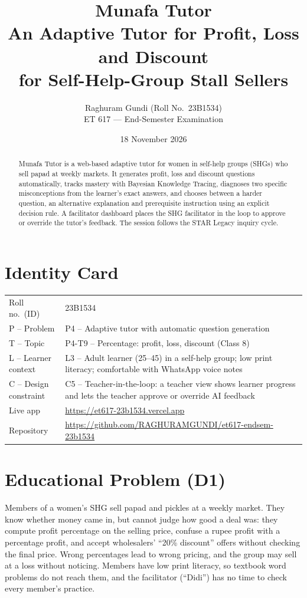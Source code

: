 \documentclass[10pt,a4paper]{article}
\title{\textbf{Munafa Tutor}\\[2pt]\large An Adaptive Tutor for Profit, Loss and Discount\\ for Self-Help-Group Stall Sellers}
\author{Raghuram Gundi \quad (Roll No.\ 23B1534)\\ ET 617 --- End-Semester Examination}
\date{18 November 2026}
\begin{document}
\maketitle

\begin{abstract}
\noindent Munafa Tutor is a web-based adaptive tutor for women in self-help groups (SHGs) who sell papad at weekly markets. It generates profit, loss and discount questions automatically, tracks mastery with Bayesian Knowledge Tracing, diagnoses two specific misconceptions from the learner's exact answers, and chooses between a harder question, an alternative explanation and prerequisite instruction using an explicit decision rule. A facilitator dashboard places the SHG facilitator in the loop to approve or override the tutor's feedback. The session follows the STAR Legacy inquiry cycle.
\end{abstract}

\section*{Identity Card}
\begin{tabularx}{\linewidth}{@{}lY@{}}
\toprule
Roll no.\ (ID) & 23B1534 \\
P -- Problem & P4 -- Adaptive tutor with automatic question generation \\
T -- Topic & P4-T9 -- Percentage: profit, loss, discount (Class 8) \\
L -- Learner context & L3 -- Adult learner (25--45) in a self-help group; low print literacy; comfortable with WhatsApp voice notes \\
C -- Design constraint & C5 -- Teacher-in-the-loop: a teacher view shows learner progress and lets the teacher approve or override AI feedback \\
Live app & \url{https://et617-23b1534.vercel.app} \\
Repository & \url{https://github.com/RAGHURAMGUNDI/et617-endsem-23b1534} \\
\bottomrule
\end{tabularx}

\section{Educational Problem (D1)}
Members of a women's SHG sell papad and pickles at a weekly market. They know whether money came in, but cannot judge how good a deal was: they compute profit percentage on the selling price, confuse a rupee profit with a percentage profit, and accept wholesalers' ``20\% discount'' offers without checking the final price. Wrong percentages lead to wrong pricing, and the group may sell at a loss without noticing. Members have low print literacy, so textbook word problems do not reach them, and the facilitator (``Didi'') has no time to check every member's practice.
\end{document}
